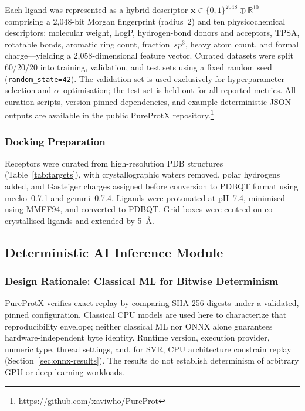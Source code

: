 \documentclass[conference]{IEEEtran}
\newcommand{\rev}[2]{#2}
\begin{document}
Each ligand was represented as a hybrid descriptor
$\mathbf{x} \in \{0,1\}^{2048} \oplus \mathbb{R}^{10}$
comprising a 2{,}048-bit Morgan fingerprint (radius~2) and
ten physicochemical descriptors: molecular weight, LogP,
hydrogen-bond donors and acceptors, TPSA, rotatable bonds,
aromatic ring count, fraction~$sp^3$, heavy atom count, and
formal charge---yielding a 2{,}058-dimensional feature vector.
Curated datasets were split 60/20/20 into training, validation,
and test sets using a fixed random seed (\texttt{random\_state=42}).
The validation set is used exclusively for hyperparameter
selection and $\alpha$~optimisation; the test set is held out
for all reported metrics.
All curation scripts, version-pinned dependencies, and example
deterministic JSON outputs are available in the public
PureProtX repository.\footnote{\url{https://github.com/xaviwho/PureProt}}

\subsubsection{Docking Preparation}
Receptors were curated from high-resolution PDB structures
(Table~\ref{tab:targets}), with crystallographic waters removed,
polar hydrogens added, and Gasteiger charges assigned before
conversion to PDBQT format using meeko~0.7.1 and gemmi~0.7.4.
Ligands were protonated at pH~7.4, minimised using MMFF94, and
converted to PDBQT.
Grid boxes were centred on co-crystallised ligands and extended
by 5~\AA.

\subsection{\textbf{Deterministic AI Inference Module}}
\label{sec:ai}

\subsubsection{Design Rationale: Classical ML for Bitwise Determinism}

\rev{R1.1}{PureProtX verifies exact replay by comparing SHA-256
digests under a validated, pinned configuration. Classical CPU
models are used here to characterize that reproducibility envelope;
neither classical ML nor ONNX alone guarantees hardware-independent
byte identity. Runtime version, execution provider, numeric type,
thread settings, and, for SVR, CPU architecture constrain replay
(Section~\ref{sec:onnx-results}). The results do not establish
determinism of arbitrary GPU or deep-learning workloads.}
\end{document}
